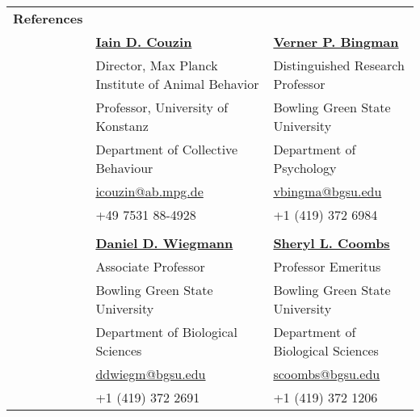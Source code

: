\documentclass[letterpaper,6pt,oneside]{article}
\begin{document}

\noindent \begin{longtable}{@{} l l l}
 \Large{\textbf{References}} \vspace{5mm} \\
 & \href{http://www.collectivebehaviour.com/couzin}{\textbf{Iain D. Couzin}} & \href{https://www.bgsu.edu/arts-and-sciences/biological-sciences/faculty-and-staff/alphabetical-listing/verner-bingman.html}{\textbf{Verner P. Bingman}} \\
 & Director, Max Planck Institute of Animal Behavior &  Distinguished Research Professor  \\
 & Professor, University of Konstanz &  Bowling Green State University \\
 & Department of Collective Behaviour  & Department of Psychology \\
 & \small{\href{mailto:icouzin@ab.mpg.de}{icouzin@ab.mpg.de}} & \small{\href{mailto:vbingma@bgsu.edu}{vbingma@bgsu.edu}} \\
 &\small{+49 7531 88-4928} & \small{+1 (419) 372 6984} \\
&& \\
  & \href{https://www.bgsu.edu/arts-and-sciences/biological-sciences/faculty-and-staff/alphabetical-listing/daniel-wiegmann.html}{\textbf{Daniel D. Wiegmann}} & \href{https://www.bgsu.edu/arts-and-sciences/neuroscience/nmb-people/faculty/sheryl-coombs.html}{\textbf{Sheryl L. Coombs}} \\
 & Associate Professor  &  Professor Emeritus \\
 & Bowling Green State University & Bowling Green State University \\
 & Department of Biological Sciences  & Department of Biological Sciences \\
 & \small{\href{mailto:ddwiegm@bgsu.edu}{ddwiegm@bgsu.edu}} & \small{\href{mailto:scoombs@bgsu.edu}{scoombs@bgsu.edu}} \\
 &\small{+1 (419) 372 2691} & \small{+1 (419) 372 1206} \\
 
\end{longtable}


\end{document}
